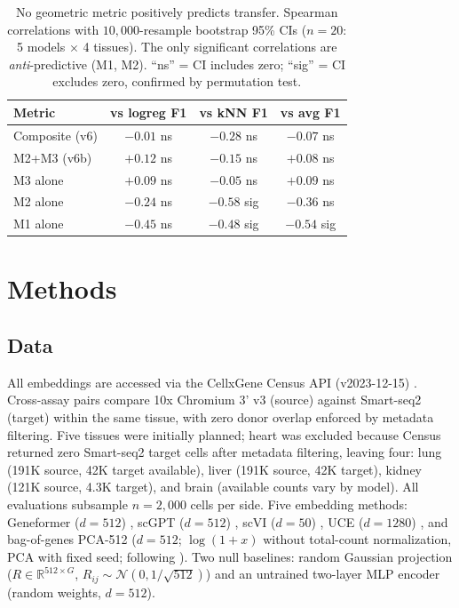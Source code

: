 \documentclass[11pt]{article}
\begin{document}
\begin{table}[t]
\centering
\caption{No geometric metric positively predicts transfer. Spearman correlations with $10{,}000$-resample bootstrap 95\% CIs ($n = 20$: 5 models $\times$ 4 tissues). The only significant correlations are \emph{anti}-predictive (M1, M2). ``ns'' = CI includes zero; ``sig'' = CI excludes zero, confirmed by permutation test.}
\label{tab:probes}
\small
\begin{tabular}{@{}lccc@{}}
\toprule
Metric & vs logreg F1 & vs kNN F1 & vs avg F1 \\
\midrule
Composite (v6) & $-0.01$ ns & $-0.28$ ns & $-0.07$ ns \\
M2+M3 (v6b) & $+0.12$ ns & $-0.15$ ns & $+0.08$ ns \\
M3 alone & $+0.09$ ns & $-0.05$ ns & $+0.09$ ns \\
M2 alone & $-0.24$ ns & $\mathbf{-0.58}$ sig & $-0.36$ ns \\
M1 alone & $-0.45$ ns & $\mathbf{-0.48}$ sig & $\mathbf{-0.54}$ sig \\
\bottomrule
\end{tabular}
\end{table}


\section{Methods}

\subsection{Data}

All embeddings are accessed via the CellxGene Census API (v2023-12-15) \citep{abdulla2025cellxgene}. Cross-assay pairs compare 10x Chromium 3' v3 (source) against Smart-seq2 (target) within the same tissue, with zero donor overlap enforced by metadata filtering. Five tissues were initially planned; heart was excluded because Census returned zero Smart-seq2 target cells after metadata filtering, leaving four: lung (191K source, 42K target available), liver (191K source, 42K target), kidney (121K source, 4.3K target), and brain (available counts vary by model). All evaluations subsample $n = 2{,}000$ cells per side. Five embedding methods: Geneformer ($d = 512$) \citep{theodoris2023geneformer}, scGPT ($d = 512$) \citep{cui2024scgpt}, scVI ($d = 50$) \citep{lopez2018scvi}, UCE ($d = 1280$) \citep{rosen2026uce}, and bag-of-genes PCA-512 ($d = 512$; $\log(1 + x)$ without total-count normalization, PCA with fixed seed; following \citealp{cole2026morpheus}). Two null baselines: random Gaussian projection ($R \in \mathbb{R}^{512 \times G}$, $R_{ij} \sim \mathcal{N}(0, 1/\sqrt{512})$) and an untrained two-layer MLP encoder (random weights, $d = 512$).
\end{document}
